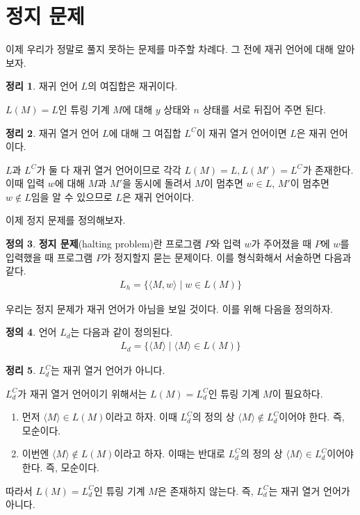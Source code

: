 \documentclass[b5paper, 10pt]{book}
\theoremstyle{definition}
\newtheorem{defn}{정의}[chapter]
\newtheorem{thm}[defn]{정리}
\newenvironment{pf*}{\pushQED{\qed}\pf}{\popQED\endpf}
\begin{document}
\section{정지 문제}
이제 우리가 정말로 풀지 못하는 문제를 마주할 차례다. 그 전에 재귀 언어에 대해 알아보자.
\begin{thm}
    재귀 언어 $L$의 여집합은 재귀이다.
\end{thm}
\begin{pf*}
    $L(M) = L$인 튜링 기계 $M$에 대해 $y$ 상태와 $n$ 상태를 서로 뒤집어 주면 된다.
\end{pf*}
\begin{thm}
    재귀 열거 언어 $L$에 대해 그 여집합 $L^C$이 재귀 열거 언어이면 $L$은 재귀 언어이다.
\end{thm}
\begin{pf*}
    $L$과 $L^C$가 둘 다 재귀 열거 언어이므로 각각 $L(M) = L, L(M') = L^C$가 존재한다. 이때 입력 $w$에
    대해 $M$과 $M'$을 동시에 돌려서 $M$이 멈추면 $w \in L$, $M'$이 멈추면 $w \notin L$임을 알 수 있으므로
    $L$은 재귀 언어이다. 
\end{pf*}
이제 정지 문제를 정의해보자. 
\begin{defn}
    \textbf{정지 문제}(halting problem)란 프로그램 $P$와 입력 $w$가 주어졌을 때 $P$에 $w$를 입력했을
    때 프로그램 $P$가 정지할지 묻는 문제이다. 이를 형식화해서 서술하면 다음과 같다.
    \begin{align*}
        L_h = \{ \langle M, w \rangle \;\vert\; w \in L(M) \}
    \end{align*}
\end{defn}
우리는 정지 문제가 재귀 언어가 아님을 보일 것이다. 이를 위해 다음을 정의하자.
\begin{defn}
    언어 $L_d$는 다음과 같이 정의된다.
    \begin{align*}
        L_d = \{ \langle M \rangle \;\vert\; \langle M \rangle \in L(M) \}
    \end{align*}
\end{defn}
\begin{thm}
    $L_d^C$는 재귀 열거 언어가 아니다. 
\end{thm}
\begin{pf*}
    $L_d^C$가 재귀 열거 언어이기 위해서는 $L(M) = L_d^C$인 튜링 기계 $M$이 필요하다.
    \begin{enumerate}
        \item  먼저 $\langle M \rangle \in L(M)$이라고 하자. 이때 $L_d^C$의 정의 상 
        $\langle M \rangle \notin L_d^C$이어야
        한다. 즉, 모순이다.
        \item  이번엔 $\langle M \rangle \notin L(M)$이라고 하자. 이때는 반대로 
        $L_d^C$의 정의 상 $\langle M \rangle \in L_d^C$이어야
        한다. 즉, 모순이다. 
    \end{enumerate}
    따라서 $L(M) = L_d^C$인 튜링 기계 $M$은 존재하지 않는다. 즉, $L_d^C$는 재귀 열거 언어가 아니다.
\end{pf*}
\end{document}
